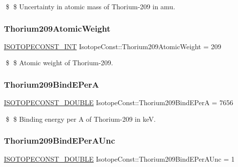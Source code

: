 \$ \$ Uncertainty in atomic mass of Thorium-\/209 in amu. \mbox{\label{group___isotope_const-_thorium-_th209_gab0da6a9121d8cdf4b185ad62f62c8344}} 
\subsubsection{\texorpdfstring{Thorium209\+Atomic\+Weight}{Thorium209AtomicWeight}}
{\footnotesize\ttfamily \mbox{\hyperlink{group___isotope_const-_macros_ga5f18360b3e99483a35c32d789e62621c}{I\+S\+O\+T\+O\+P\+E\+C\+O\+N\+S\+T\+\_\+\+I\+NT}} Isotope\+Const\+::\+Thorium209\+Atomic\+Weight = 209}

\$ \$ Atomic weight of Thorium-\/209. \mbox{\label{group___isotope_const-_thorium-_th209_ga5e52cbc3286ca76efccde0515036e545}} 
\subsubsection{\texorpdfstring{Thorium209\+Bind\+E\+PerA}{Thorium209BindEPerA}}
{\footnotesize\ttfamily \mbox{\hyperlink{group___isotope_const-_macros_ga8f45a7272ce02c0b4c65c44636ed719a}{I\+S\+O\+T\+O\+P\+E\+C\+O\+N\+S\+T\+\_\+\+D\+O\+U\+B\+LE}} Isotope\+Const\+::\+Thorium209\+Bind\+E\+PerA = 7656}

\$ \$ Binding energy per A of Thorium-\/209 in keV. \mbox{\label{group___isotope_const-_thorium-_th209_ga5edb49f2a10ae8820b920338fb5309a1}} 
\subsubsection{\texorpdfstring{Thorium209\+Bind\+E\+Per\+A\+Unc}{Thorium209BindEPerAUnc}}
{\footnotesize\ttfamily \mbox{\hyperlink{group___isotope_const-_macros_ga8f45a7272ce02c0b4c65c44636ed719a}{I\+S\+O\+T\+O\+P\+E\+C\+O\+N\+S\+T\+\_\+\+D\+O\+U\+B\+LE}} Isotope\+Const\+::\+Thorium209\+Bind\+E\+Per\+A\+Unc = 1}

